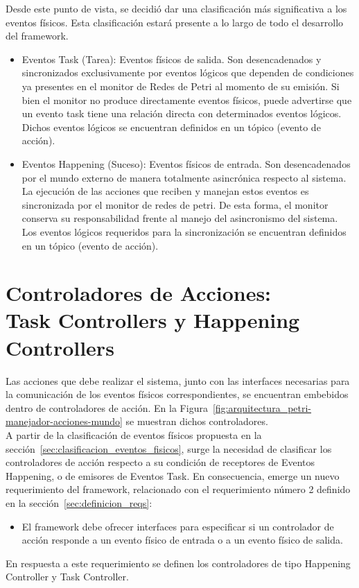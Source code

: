 Desde este punto de vista, se decidió dar una clasificación más significativa a
los eventos físicos. Esta clasificación estará presente a lo largo de todo
el desarrollo del framework.
\begin{itemize}
  \item Eventos Task (Tarea): Eventos físicos de salida. Son
  desencadenados y sincronizados exclusivamente por eventos lógicos que dependen
  de condiciones ya presentes en el monitor de Redes de Petri al momento de su
  emisión. Si bien el monitor no produce directamente eventos físicos, puede
  advertirse que un evento task tiene una relación directa con determinados
  eventos lógicos. Dichos eventos lógicos se encuentran definidos en un tópico
  (evento de acción).
  \item Eventos Happening (Suceso): Eventos físicos de entrada. Son
  desencadenados por el mundo externo de manera totalmente asincrónica respecto
  al sistema. La ejecución de las acciones que reciben y manejan estos eventos
  es sincronizada por el monitor de redes de petri. De esta forma, el monitor
  conserva su responsabilidad frente al manejo del asincronismo del sistema.
  Los eventos lógicos requeridos para la sincronización se encuentran definidos
  en un tópico (evento de acción).
\end{itemize}

\section{Controladores de Acciones: \\ Task Controllers y Happening Controllers}
\label{sec:controladores_de_acciones}

Las acciones que debe realizar el sistema, junto con las interfaces necesarias
para la comunicación de los eventos físicos correspondientes, se encuentran
embebidos dentro de controladores de acción. En la
Figura~\ref{fig:arquitectura_petri-manejador-acciones-mundo} se muestran dichos
controladores.\\

A partir de la clasificación de eventos físicos propuesta en la
sección~\ref{sec:clasificacion_eventos_fisicos}, surge la necesidad de
clasificar los controladores de acción respecto a su condición de receptores de
Eventos Happening, o de emisores de Eventos Task. En consecuencia, emerge un
nuevo requerimiento del framework, relacionado con el requerimiento número 2
definido en la sección~\ref{sec:definicion_reqs}:
\begin{itemize}
    \item El framework debe ofrecer interfaces para especificar si un
    controlador de acción responde a un evento físico de entrada o a un
    evento físico de salida.
\end{itemize}
En respuesta a este requerimiento se definen los controladores de tipo
Happening Controller y Task Controller.

